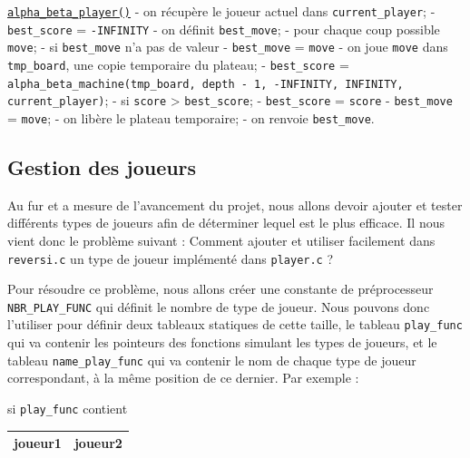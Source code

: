 \documentclass{report}
\begin{document}
\underline{\texttt{alpha\_beta\_player()}}
\newline
\newline
- on récupère le joueur actuel dans \texttt{current\_player};\newline
- \texttt{best\_score} = \texttt{-INFINITY}\newline
- on définit \texttt{best\_move};\newline
- pour chaque coup possible \texttt{move};
\tabto{1 cm} - si \texttt{best\_move} n'a pas de valeur
\tabto{2 cm} - \texttt{best\_move} = \texttt{move}
\tabto{1 cm} - on joue \texttt{move} dans \texttt{tmp\_board}, une copie temporaire du plateau;
\tabto{1 cm} - \texttt{best\_score} = \texttt{alpha\_beta\_machine(tmp\_board, depth - 1, -INFINITY, INFINITY, current\_player)};
\tabto{1 cm} - si \texttt{score} > \texttt{best\_score};
\tabto{2 cm} - \texttt{best\_score} = \texttt{score}
\tabto{2 cm} - \texttt{best\_move} = \texttt{move};
\tabto{1 cm} - on libère le plateau temporaire;
\newline
- on renvoie \texttt{best\_move}.\newline
\newline

\subsection{Gestion des joueurs}

Au fur et a mesure de l'avancement du projet, nous allons devoir ajouter et tester différents types de joueurs afin de déterminer lequel est le plus efficace. Il nous vient donc le problème suivant : Comment ajouter et utiliser facilement dans \texttt{reversi.c} un type de joueur implémenté dans \texttt{player.c} ?

Pour résoudre ce problème, nous allons créer une constante de préprocesseur \texttt{NBR\_PLAY\_FUNC} qui définit le nombre de type de joueur. Nous pouvons donc l'utiliser pour définir deux tableaux statiques de cette taille, le tableau \texttt{play\_func} qui va contenir les pointeurs des fonctions simulant les types de joueurs, et le tableau \texttt{name\_play\_func} qui va contenir le nom de chaque type de joueur correspondant, à la même position de ce dernier.
\newline
Par exemple :

si \texttt{play\_func} contient
\begin{center}
\renewcommand{\arraystretch} {1.5}
       \begin{tabular}{|c|c|}
        \hline
        joueur1 & joueur2 \\
        \hline
    \end{tabular}
\end{center}
\end{document}
